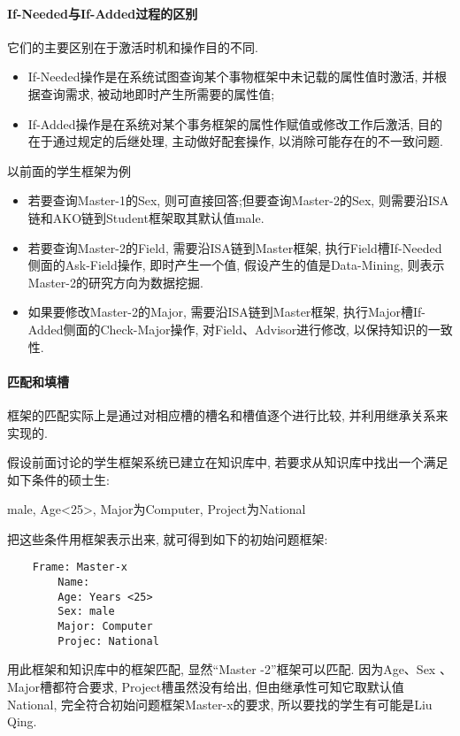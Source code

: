 \paragraph{If-Needed与If-Added过程的区别}
它们的主要区别在于激活时机和操作目的不同.
\begin{itemize}
\item If-Needed操作是在系统试图查询某个事物框架中未记载的属性值时激活, 并根据查询需求, 被动地即时产生所需要的属性值;
\item If-Added操作是在系统对某个事务框架的属性作赋值或修改工作后激活, 目的在于通过规定的后继处理, 主动做好配套操作, 以消除可能存在的不一致问题.
\end{itemize}
\begin{example}
以前面的学生框架为例
\begin{itemize}
\item 若要查询Master-1的Sex, 则可直接回答;但要查询Master-2的Sex, 则需要沿ISA链和AKO链到Student框架取其默认值male.
\item 若要查询Master-2的Field, 需要沿ISA链到Master框架, 执行Field槽If-Needed侧面的Ask-Field操作, 即时产生一个值, 假设产生的值是Data-Mining, 则表示Master-2的研究方向为数据挖掘.
\item 如果要修改Master-2的Major, 需要沿ISA链到Master框架, 执行Major槽If-Added侧面的Check-Major操作, 对Field、Advisor进行修改, 以保持知识的一致性.
\end{itemize}
\end{example}
\paragraph{匹配和填槽}
框架的匹配实际上是通过对相应槽的槽名和槽值逐个进行比较, 并利用继承关系来实现的.
\begin{example}
假设前面讨论的学生框架系统已建立在知识库中, 若要求从知识库中找出一个满足如下条件的硕士生:
\begin{center}
  male, Age<25>, Major为Computer, Project为National
\end{center}
把这些条件用框架表示出来, 就可得到如下的初始问题框架:
\begin{Verbatim}
    Frame: Master-x
        Name:
        Age: Years <25>
        Sex: male
        Major: Computer
        Projec: National
\end{Verbatim}
\end{example}
用此框架和知识库中的框架匹配, 显然“Master -2”框架可以匹配. 因为Age、Sex 、Major槽都符合要求, Project槽虽然没有给出, 但由继承性可知它取默认值National, 完全符合初始问题框架Master-x的要求, 所以要找的学生有可能是Liu Qing.
